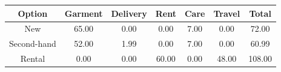 \begin{tabular}{@{}ccccccc@{}}
\toprule
Option & Garment & Delivery & Rent & Care & Travel & Total \\
\midrule
New & 65.00 & 0.00 & 0.00 & 7.00 & 0.00 & 72.00 \\
Second-hand & 52.00 & 1.99 & 0.00 & 7.00 & 0.00 & 60.99 \\
Rental & 0.00 & 0.00 & 60.00 & 0.00 & 48.00 & 108.00 \\
\bottomrule
\end{tabular}
